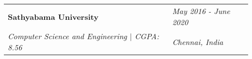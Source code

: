 \newcommand{\educationItem}[4]{
    \begin{tabular*}{\textwidth}{@{}l@{\extracolsep{\fill}}l@{}}
        \textbf{#1} & \textit{#2} \\ %
        \textit{#3} & \textit{#4} \\ %
    \end{tabular*}
    \vspace{-4pt}
}

\section{}

\educationItem{Sathyabama University}{May 2016 - June 2020}{Computer Science and Engineering $|$ CGPA: 8.56}{Chennai, India}
